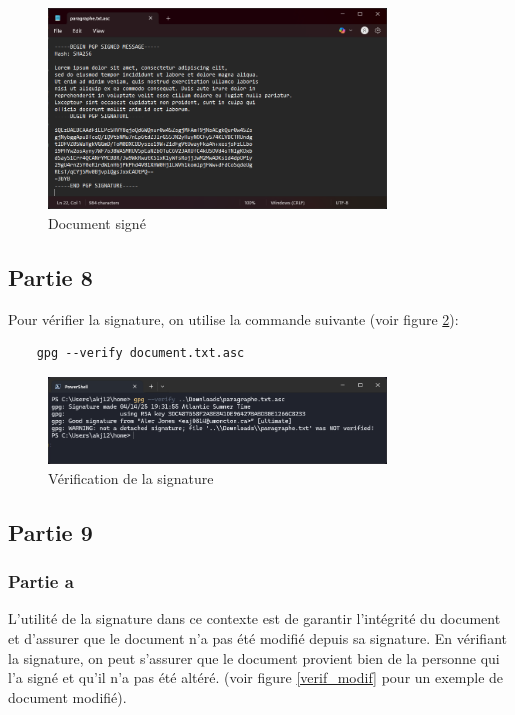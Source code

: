 \documentclass[12pt,a4paper]{article}
\begin{document}
\begin{figure}[ht]
    \centering
    \includegraphics[width=0.8\textwidth]{../img/sign.png}
    \caption{Document signé}
    \label{sign}
\end{figure}

\subsection{Partie 8}
Pour vérifier la signature, on utilise la commande suivante (voir figure \ref{verif}):
\begin{verbatim}
    gpg --verify document.txt.asc
\end{verbatim}

\begin{figure}[ht]
    \centering
    \includegraphics[width=0.8\textwidth]{../img/verif.png}
    \caption{Vérification de la signature}
    \label{verif}
\end{figure}

\subsection{Partie 9}
\subsubsection{Partie a}
L'utilité de la signature dans ce contexte est de garantir l'intégrité du document et d'assurer que le document n'a pas été modifié depuis sa signature.
En vérifiant la signature, on peut s'assurer que le document provient bien de la personne qui l'a signé et qu'il n'a pas été altéré.
(voir figure \ref{verif_modif} pour un exemple de document modifié).
\end{document}
